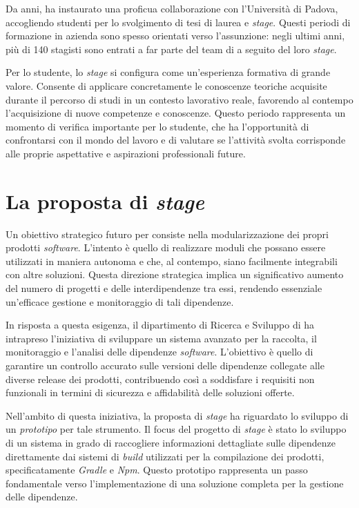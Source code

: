 \noindent Da anni, {\azienda} ha instaurato una proficua collaborazione con l'Università di Padova, accogliendo studenti per lo 
svolgimento di tesi di laurea e \textit{stage}. Questi periodi di formazione in azienda sono spesso orientati verso l'assunzione: negli 
ultimi anni, più di 140 stagisti sono entrati a far parte del team di {\azienda} a seguito del loro \textit{stage}.

Per lo studente, lo \textit{stage} si configura come un'esperienza formativa di grande valore. Consente di applicare concretamente le 
conoscenze teoriche acquisite durante il percorso di studi in un contesto lavorativo reale, favorendo al contempo l'acquisizione 
di nuove competenze e conoscenze. Questo periodo rappresenta un momento di verifica importante per lo studente, che ha l'opportunità 
di confrontarsi con il mondo del lavoro e di valutare se l'attività svolta corrisponde alle proprie aspettative e aspirazioni professionali future.


\section{La proposta di \textit{stage}}

Un obiettivo strategico futuro per {\azienda} consiste nella modularizzazione dei propri prodotti \textit{software}. 
L'intento è quello di realizzare moduli che possano essere utilizzati in maniera autonoma e che, al contempo, 
siano facilmente integrabili con altre soluzioni. Questa direzione strategica implica un significativo aumento
del numero di progetti e delle interdipendenze tra essi, rendendo essenziale un'efficace gestione e monitoraggio di tali dipendenze.

In risposta a questa esigenza, il dipartimento di Ricerca e Sviluppo di {\azienda} ha intrapreso l'iniziativa 
di sviluppare un sistema avanzato per la raccolta, il monitoraggio e l'analisi delle dipendenze \textit{software}. 
L'obiettivo è quello di garantire un controllo accurato sulle versioni delle dipendenze collegate alle diverse release dei prodotti, 
contribuendo così a soddisfare i requisiti non funzionali in termini di sicurezza e affidabilità delle soluzioni offerte.

Nell'ambito di questa iniziativa, la proposta di \textit{stage} ha riguardato lo sviluppo di un \textit{\gls{prototipo}} per tale strumento. 
Il focus del progetto di \textit{stage} è stato lo sviluppo di un sistema in grado di raccogliere informazioni dettagliate sulle dipendenze 
direttamente dai sistemi di \textit{build} utilizzati per la compilazione dei prodotti, specificatamente \textit{\gls{Gradle}} e \textit{\gls{Npm}}. 
Questo prototipo rappresenta un passo fondamentale verso l'implementazione di una soluzione completa per la gestione delle dipendenze.

